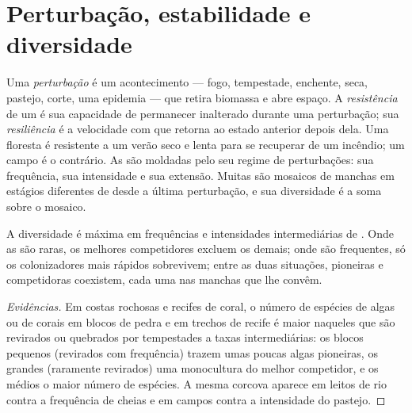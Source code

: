 \section{Perturbação, estabilidade e diversidade}

\begin{definition}\label{def:b1:ecosystem-dynamics:disturbance}
Uma \emph{perturbação} é um acontecimento --- fogo, tempestade,
enchente, seca, pastejo, corte, uma epidemia --- que retira biomassa e
abre espaço. A \emph{resistência} de um  é sua capacidade
de permanecer inalterado durante uma perturbação; sua
\emph{resiliência} é a velocidade com que retorna ao estado anterior
depois dela. Uma floresta é resistente a um verão seco e lenta para se
recuperar de um incêndio; um campo é o contrário. As  são
moldadas pelo seu regime de perturbações: sua frequência, sua
intensidade e sua extensão. Muitas  são mosaicos de manchas
em estágios diferentes de  desde a última perturbação, e sua
diversidade é a soma sobre o mosaico.
\end{definition}

\begin{proposition}\label{prop:b1:ecosystem-dynamics:idh}
A diversidade é máxima em frequências e intensidades intermediárias de
. Onde as  são raras, os melhores competidores
excluem os demais; onde são frequentes, só os colonizadores mais
rápidos sobrevivem; entre as duas situações, pioneiras e competidoras
coexistem, cada uma nas manchas que lhe convêm.
\end{proposition}
\begin{proof}[Evidências]
Em costas rochosas e recifes de coral, o número de espécies de algas
ou de corais em blocos de pedra e em trechos de recife é maior naqueles
que são revirados ou quebrados por tempestades a taxas intermediárias:
os blocos pequenos (revirados com frequência) trazem umas poucas algas
pioneiras, os grandes (raramente revirados) uma monocultura do melhor
competidor, e os médios o maior número de espécies. A mesma corcova
aparece em leitos de rio contra a frequência de cheias e em campos
contra a intensidade do pastejo.
\end{proof}

